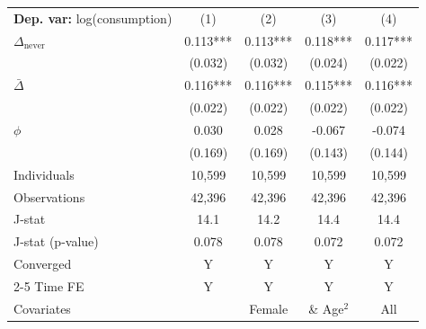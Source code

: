 \begin{tabular}{l cccc} \toprule  \textbf{Dep. var:}  log(consumption) 
                    &\multicolumn{1}{c}{(1)}   &\multicolumn{1}{c}{(2)}   &\multicolumn{1}{c}{(3)}   &\multicolumn{1}{c}{(4)}   \\

\addlinespace
$\Delta_{\text{never}}$&       0.113***&       0.113***&       0.118***&       0.117***\\
                    &     (0.032)   &     (0.032)   &     (0.024)   &     (0.022)   \\

\addlinespace
$\bar{\Delta}$      &       0.116***&       0.116***&       0.115***&       0.116***\\
                    &     (0.022)   &     (0.022)   &     (0.022)   &     (0.022)   \\

\addlinespace
$\phi$              &       0.030   &       0.028   &      -0.067   &      -0.074   \\
                    &     (0.169)   &     (0.169)   &     (0.143)   &     (0.144)   \\
\addlinespace
Individuals         &      10,599   &      10,599   &      10,599   &      10,599   \\
Observations        &      42,396   &      42,396   &      42,396   &      42,396   \\
J-stat              &        14.1   &        14.2   &        14.4   &        14.4   \\
J-stat (p-value)    &       0.078   &       0.078   &       0.072   &       0.072   \\
Converged           &           Y   &           Y   &           Y   &           Y   \\
\cmidrule{2-5} Time FE & Y & Y & Y & Y \\ Covariates & & Female & \& Age$^2$ & All \\ \bottomrule \end{tabular}
